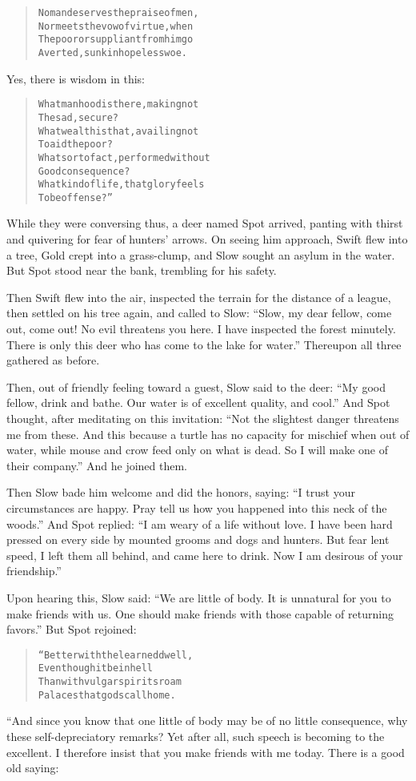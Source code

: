 \documentclass[article, twoside, 14pt]{memoir}
\renewenvironment{verbatim}{%
\begin{quote}%
\vskip -10pt%
\begin{alltt}\normalfont\large}{\end{alltt}%
\end{quote}%
\vskip -10pt
} %
\begin{document}
\begin{verbatim}
No man deserves the praise of men,
Nor meets the vow of virtue, when
The poor or suppliant from him go
Averted, sunk in hopeless woe.
\end{verbatim}
Yes, there is wisdom in this:

\begin{verbatim}
What manhood is there, making not
    The sad, secure?
What wealth is that, availing not
    To aid the poor?
What sort of act, performed without
    Good consequence?
What kind of life, that glory feels
    To be offense?”
\end{verbatim}
While they were conversing thus, a deer named Spot arrived, panting
with thirst and quivering for fear of hunters' arrows. On seeing
him approach, Swift flew into a tree, Gold crept into a
grass-clump, and Slow sought an asylum in the water. But Spot stood
near the bank, trembling for his safety.

Then Swift flew into the air, inspected the terrain for the
distance of a league, then settled on his tree again, and called to
Slow:
``Slow, my dear fellow, come out, come out! No evil threatens you here. I have inspected the forest minutely. There is only this deer who has come to the lake for water.''
Thereupon all three gathered as before.

Then, out of friendly feeling toward a guest, Slow said to the
deer:
``My good fellow, drink and bathe. Our water is of excellent quality, and cool.''
And Spot thought, after meditating on this invitation:
``Not the slightest danger threatens me from these. And this because a turtle has no capacity for mischief when out of water, while mouse and crow feed only on what is dead. So I will make one of their company.''
And he joined them.

Then Slow bade him welcome and did the honors, saying:
``I trust your circumstances are happy. Pray tell us how you happened into this neck of the woods.''
And Spot replied:
``I am weary of a life without love. I have been hard pressed on every side by mounted grooms and dogs and hunters. But fear lent speed, I left them all behind, and came here to drink. Now I am desirous of your friendship.''

Upon hearing this, Slow said:
``We are little of body. It is unnatural for you to make friends with us. One should make friends with those capable of returning favors.''
But Spot rejoined:

\begin{verbatim}
“Better with the learned dwell,
Even though it be in hell
Than with vulgar spirits roam
Palaces that gods call home.
\end{verbatim}
“And since you know that one little of body may be of no little
consequence, why these self-depreciatory remarks? Yet after all,
such speech is becoming to the excellent. I therefore insist that
you make friends with me today. There is a good old saying:
\end{document}

